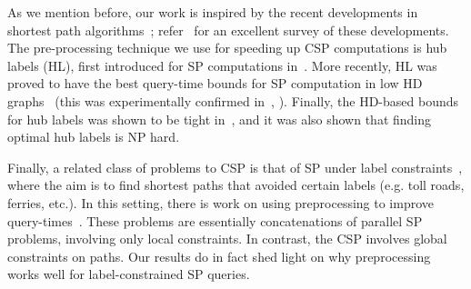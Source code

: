 As we mention before, our work is inspired by the recent developments in shortest path algorithms~\cite{highway2013,hubimplem,highway2010,dimacs09,geisberger_ch_definition,skeleton}; refer~\cite{goldberg_survey} for an excellent survey of these developments. 
The pre-processing technique we use for speeding up CSP computations is hub labels (HL), first introduced for SP computations in~\cite{cohen_definition_hl}. 
More recently, HL was proved to have the best query-time bounds for SP computation in low HD graphs~\cite{highway2013,highway2010} (this was experimentally confirmed in~\cite{hubimplem}, \cite[Figure 7]{goldberg_survey}).  
Finally, the HD-based bounds for hub labels was shown to be tight in~\cite{babenko_hl_complexity,white_complexity_hd}, and it was also shown that finding optimal hub labels is NP hard.

Finally, a related class of problems to CSP is that of SP under label constraints~\cite{language_csp}, where the aim is to find shortest paths that avoided certain labels (e.g. toll roads, ferries, etc.). 
In this setting, there is work on using preprocessing to improve query-times~\cite{rice_csp}.
These problems are essentially concatenations of parallel SP problems, involving only local constraints. 
In contrast, the CSP involves global constraints on paths.
Our results do in fact shed light on why preprocessing works well for label-constrained SP queries.